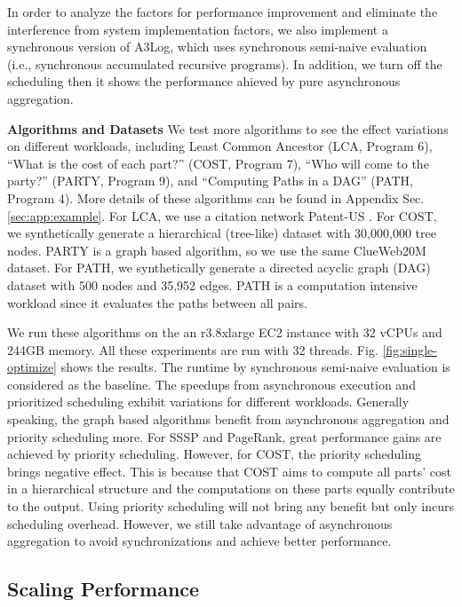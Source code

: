 In order to analyze the factors for performance improvement and eliminate the interference from system implementation factors, we also implement a synchronous version of A3Log, which uses synchronous semi-naive evaluation (i.e., synchronous accumulated recursive programs). In addition, we turn off the scheduling then it shows the performance ahieved by pure asynchronous aggregation.

\noindent\textbf{Algorithms and Datasets}
We test more algorithms to see the effect variations on different workloads, including Least Common Ancestor (LCA, Program 6), ``What is the cost of each part?'' (COST, Program 7), ``Who will come to the party?'' (PARTY, Program 9), and ``Computing Paths in a DAG'' (PATH, Program 4). More details of these algorithms can be found in Appendix Sec. \ref{sec:app:example}. For LCA, we use a citation network Patent-US \cite{konect}. For COST, we synthetically generate a hierarchical (tree-like) dataset with 30,000,000 tree nodes. PARTY is a graph based algorithm, so we use the same ClueWeb20M dataset. For PATH, we synthetically generate a directed acyclic graph (DAG) dataset with 500 nodes and 35,952 edges. PATH is a computation intensive workload since it evaluates the paths between all pairs.


We run these algorithms on the an r3.8xlarge EC2 instance with 32 vCPUs and 244GB memory. All these experiments are run with 32 threads. Fig. \ref{fig:single-optimize} shows the results. The runtime by synchronous semi-naive evaluation is considered as the baseline. The speedups from asynchronous execution and prioritized scheduling exhibit variations for different workloads. Generally speaking, the graph based algorithms benefit from asynchronous aggregation and priority scheduling more. For SSSP and PageRank, great performance gains are achieved by priority scheduling. However, for COST, the priority scheduling brings negative effect. This is because that COST aims to compute all parts' cost in a hierarchical structure and the computations on these parts equally contribute to the output. Using priority scheduling will not bring any benefit but only incurs scheduling overhead. However, we still take advantage of asynchronous aggregation to avoid synchronizations and achieve better performance.


 \subsection{Scaling Performance}
 \label{sec:expr:scale}
 
